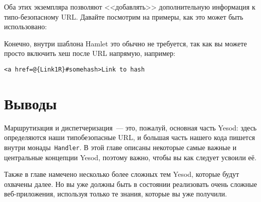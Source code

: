 Оба этих экземпляра позволяют <<добавлять>> дополнительную информация к
типо-безопасному URL. Давайте посмотрим на примеры, как это может быть
использовано:


Конечно, внутри шаблона Hamlet это обычно не требуется, так как вы можете
просто включить хеш после URL напрямую, например:
\begin{lstlisting}
<a href=@{Link1R}#somehash>Link to hash
\end{lstlisting}

\section{Выводы}
Маршрутизация и диспетчеризация~--- это, пожалуй, основная часть Yesod: здесь
определяются наши типобезопасные URL, и большая часть нашего кода
пишется внутри монады~\lstinline!Handler!. В этой главе описаны
некоторые самые важные и центральные концепции Yesod, поэтому важно,
чтобы вы как следует усвоили её.

Также в главе намечено несколько более сложных тем Yesod, которые
будут охвачены далее. Но вы уже должны быть в состоянии реализовать
очень сложные веб-приложения, используя только те знания,
которые вы уже получили.
